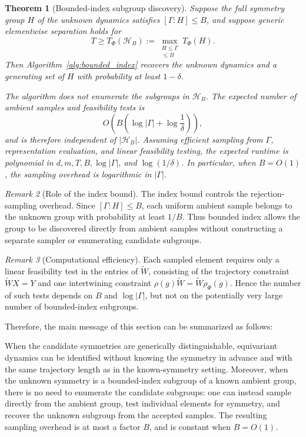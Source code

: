 \documentclass[11pt]{article}
\theoremstyle{plain}
\newtheorem{theorem}{Theorem}[section]
\theoremstyle{definition}
\theoremstyle{remark}
\newtheorem{remark}[theorem]{Remark}
\begin{document}
\begin{theorem}[Bounded-index subgroup discovery]
\label{cor:bounded_index}
Suppose the full symmetry group \(H\) of the unknown dynamics satisfies
\([\Gamma:H]\le B\), and suppose generic elementwise separation holds for
\[
T\ge
T_\Phi(\mathcal H_B)
:=
\max_{\substack{H\le\Gamma\\
[\Gamma:H]\le B}}
T_\Phi(H).
\]
Then Algorithm~\ref{alg:bounded_index} recovers the unknown dynamics and a
generating set of \(H\) with probability at least \(1-\delta\).

The algorithm does not enumerate the subgroups in \(\mathcal H_B\). The
expected number of ambient samples and feasibility tests is
\[
O\left(
B\left(
\log|\Gamma|+\log\frac1\delta
\right)
\right),
\]
and is therefore independent of \(|\mathcal H_B|\). Assuming efficient
sampling from \(\Gamma\), representation evaluation, and linear feasibility
testing, the expected runtime is polynomial in
\(d,m,T,B,\log|\Gamma|\), and \(\log(1/\delta)\). In particular, when
\(B=O(1)\), the sampling overhead is logarithmic in \(|\Gamma|\).
\end{theorem}

\begin{remark}[Role of the index bound]
The index bound controls the rejection-sampling overhead. Since
\([\Gamma:H]\le B\), each uniform ambient sample belongs to the unknown group
with probability at least \(1/B\). Thus bounded index allows the group to be
discovered directly from ambient samples without constructing a separate
sampler or enumerating candidate subgroups.
\end{remark}

\begin{remark}[Computational efficiency]
Each sampled element requires only a linear feasibility test in the entries of
\(\widetilde W\), consisting of the trajectory constraint
\(\widetilde W X=Y\) and one intertwining constraint
\(\rho(g)\widetilde W=\widetilde W\rho_\Phi(g)\). Hence the number of such
tests depends on \(B\) and \(\log|\Gamma|\), but not on the potentially very
large number of bounded-index subgroups.
\end{remark}

Therefore, the main message of this section can be summarized as follows:
\begin{tcolorbox}
When the candidate symmetries are generically distinguishable, equivariant
dynamics can be identified without knowing the symmetry in advance and with
the same trajectory length as in the known-symmetry setting. Moreover, when
the unknown symmetry is a bounded-index subgroup of a known ambient group,
there is no need to enumerate the candidate subgroups: one can instead sample
directly from the ambient group, test individual elements for symmetry, and
recover the unknown subgroup from the accepted samples. The resulting
sampling overhead is at most a factor \(B\), and is constant when
\(B=O(1)\).
\end{tcolorbox}
\end{document}

